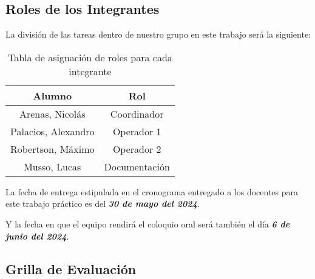 
\subsection{Roles de los Integrantes}

La división de las tareas dentro de nuestro grupo en este trabajo será la siguiente: 

\begin{table}[H]
    \centering
    \begin{tabular}{|c|c|}
    \hline
        Alumno & Rol \\
    \hline
        Arenas, Nicolás & Coordinador \\ 
        Palacios, Alexandro & Operador 1 \\
        Robertson, Máximo & Operador 2 \\
        Musso, Lucas & Documentación \\
    \hline
        \end{tabular}
        \def\tablename{Tabla} 
        \caption{Tabla de asignación de roles para cada integrante}
        \label{tab:roles}
\end{table}

La fecha de entrega estipulada en el cronograma entregado a los docentes para este trabajo práctico es del \textbf{\textit{30 de mayo del 2024}}.

Y la fecha en que el equipo rendirá el coloquio oral será también el día \textbf{\textit{6 de junio del 2024}}.



\subsection{Grilla de Evaluación}

